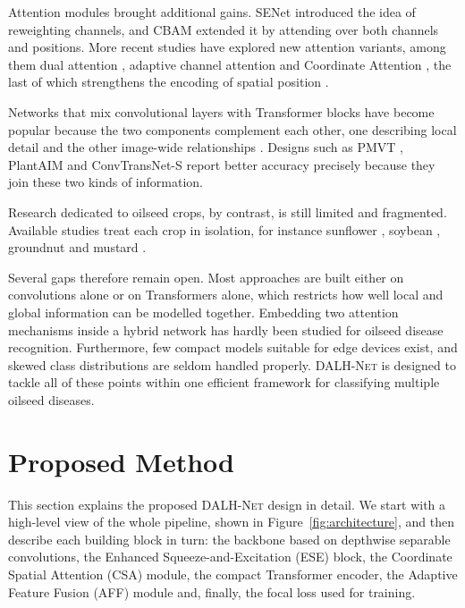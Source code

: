 \documentclass[default, iicol]{sn-jnl}
\theoremstyle{thmstyleone}%
\theoremstyle{thmstyletwo}%
\theoremstyle{thmstylethree}%
\newcommand{\dalh}{\textsc{DALH-Net}}
\begin{document}
Attention modules brought additional gains. SENet \cite{hu2018squeeze} introduced the idea of reweighting channels, and CBAM \cite{woo2018cbam} extended it by attending over both channels and positions. More recent studies have explored new attention variants, among them dual attention \cite{zhang2024lightweight}, adaptive channel attention \cite{ma2024ercp} and Coordinate Attention \cite{hou2021coordinate}, the last of which strengthens the encoding of spatial position \cite{chen2021dfcanet}.

Networks that mix convolutional layers with Transformer blocks have become popular because the two components complement each other, one describing local detail and the other image-wide relationships \cite{khan2023hybrid,vaswani2017attention}. Designs such as PMVT \cite{li2023pmvt}, PlantAIM \cite{chai2025plantaim} and ConvTransNet-S \cite{lee2024convtransnet} report better accuracy precisely because they join these two kinds of information.

Research dedicated to oilseed crops, by contrast, is still limited and fragmented. Available studies treat each crop in isolation, for instance sunflower \cite{dergi2024sunflower,sara2022sunflower}, soybean \cite{yu2023recognition,yang2024recognition}, groundnut \cite{sivaganesan2024groundnut,vyas2023groundnut} and mustard \cite{zhao2024canola}.

Several gaps therefore remain open. Most approaches are built either on convolutions alone or on Transformers alone, which restricts how well local and global information can be modelled together. Embedding two attention mechanisms inside a hybrid network has hardly been studied for oilseed disease recognition. Furthermore, few compact models suitable for edge devices exist, and skewed class distributions are seldom handled properly. \dalh{} is designed to tackle all of these points within one efficient framework for classifying multiple oilseed diseases.


\section{Proposed Method}\label{sec:methodology}

This section explains the proposed \dalh{} design in detail. We start with a high-level view of the whole pipeline, shown in Figure~\ref{fig:architecture}, and then describe each building block in turn: the backbone based on depthwise separable convolutions, the Enhanced Squeeze-and-Excitation (ESE) block, the Coordinate Spatial Attention (CSA) module, the compact Transformer encoder, the Adaptive Feature Fusion (AFF) module and, finally, the focal loss used for training.
\end{document}
